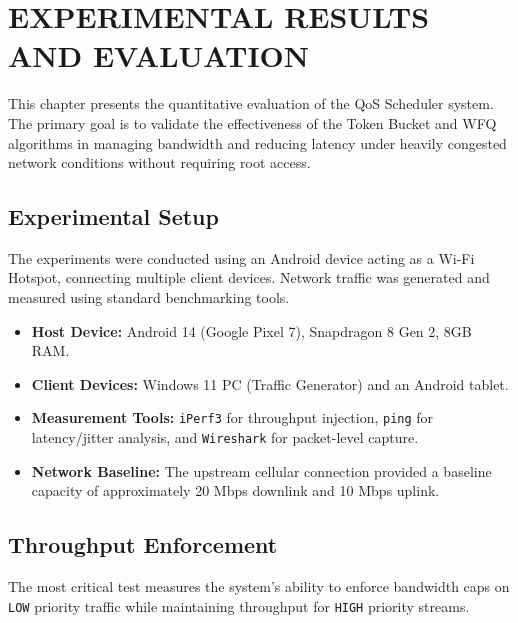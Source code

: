 
\chapter{EXPERIMENTAL RESULTS AND EVALUATION}
\label{chap:results}

This chapter presents the quantitative evaluation of the QoS Scheduler system. The primary goal is to validate the effectiveness of the Token Bucket and WFQ algorithms in managing bandwidth and reducing latency under heavily congested network conditions without requiring root access.

\section{Experimental Setup}
\label{sec:experimental_setup}

The experiments were conducted using an Android device acting as a Wi-Fi Hotspot, connecting multiple client devices. Network traffic was generated and measured using standard benchmarking tools.

\begin{itemize}
    \item \textbf{Host Device:} Android 14 (Google Pixel 7), Snapdragon 8 Gen 2, 8GB RAM.
    \item \textbf{Client Devices:} Windows 11 PC (Traffic Generator) and an Android tablet.
    \item \textbf{Measurement Tools:} \texttt{iPerf3} for throughput injection, \texttt{ping} for latency/jitter analysis, and \texttt{Wireshark} for packet-level capture.
    \item \textbf{Network Baseline:} The upstream cellular connection provided a baseline capacity of approximately 20 Mbps downlink and 10 Mbps uplink.
\end{itemize}

\section{Throughput Enforcement}
\label{sec:results_throughput}

The most critical test measures the system's ability to enforce bandwidth caps on \texttt{LOW} priority traffic while maintaining throughput for \texttt{HIGH} priority streams.


